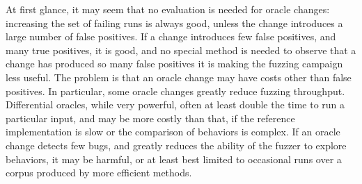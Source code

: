 At first glance, it may seem that no evaluation is needed for oracle changes: increasing the set of failing runs is always good, unless the change introduces a large number of false positives.  If a change introduces few false positives, and many true positives, it is good, and no special method is needed to observe that a change has produced so many false positives it is making the fuzzing campaign less useful.  The problem is that an oracle change may have costs other than false positives.  In particular, some oracle changes greatly reduce fuzzing throughput.  Differential oracles, while very powerful, often at least double the time to run a particular input, and may be more costly than that, if the reference implementation is slow or the comparison of behaviors is complex.  If an oracle change detects few bugs, and greatly reduces the ability of the fuzzer to explore behaviors, it may be harmful, or at least best limited to occasional runs over a corpus produced by more efficient methods.